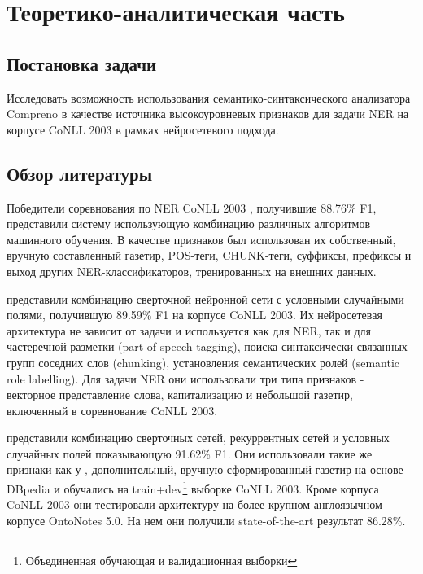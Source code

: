 \chapter{Теоретико-аналитическая часть}

  \section{Постановка задачи}

    Исследовать возможность использования семантико-синтаксического
    анализатора Compreno в качестве источника высокоуровневых признаков для задачи
    NER на корпусе CoNLL 2003 в рамках нейросетевого подхода.

  \section{Обзор литературы}

    Победители соревнования по NER CoNLL 2003 \citep{florian2003named}, получившие 88.76\% F1,
    представили систему использующую комбинацию различных алгоритмов машинного обучения.
    В качестве признаков был использован их собственный, вручную составленный газетир,
    POS-теги, CHUNK-теги, суффиксы, префиксы и выход других NER-классификаторов,
    тренированных на внешних данных.

    \citep{collobert2011natural} представили комбинацию сверточной нейронной сети
    с условными случайными полями, получившую 89.59\% F1 на корпусе CoNLL 2003.
    Их нейросетевая архитектура не зависит от задачи и используется как для NER, так и для
    частеречной разметки (part-of-speech tagging), поиска синтаксически связанных групп
    соседних слов (chunking), установления семантических ролей (semantic role labelling).
    Для задачи NER они использовали три типа признаков - векторное представление слова,
    капитализацию и небольшой газетир, включенный в соревнование CoNLL 2003.

    \citep{chiu2015named} представили комбинацию сверточных сетей, рекуррентных сетей
    и условных случайных полей показывающую 91.62\% F1.
    Они использовали такие же признаки как у \citep{collobert2011natural}, дополнительный, вручную сформированный
    газетир на основе DBpedia и обучались на
    train+dev\footnote{Объединенная обучающая и валидационная выборки} выборке CoNLL 2003.
    Кроме корпуса CoNLL 2003 они тестировали архитектуру
    на более крупном англоязычном корпусе OntoNotes 5.0. На нем они получили
    state-of-the-art результат 86.28\%.

